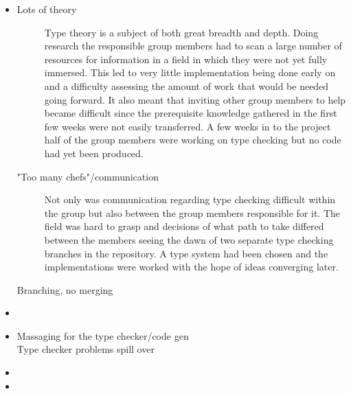 \begin{itemize}
  \item {}
  \begin{description}
    \item[Lots of theory]
      Type theory is a subject of both great breadth and depth. Doing research the responsible group members had to scan a large number of resources for information in a field in which they were not yet fully immersed. This led to very little implementation being done early on and a difficulty assessing the amount of work that would be needed going forward. It also meant that inviting other group members to help became difficult since the prerequisite knowledge gathered in the first few weeks were not easily transferred. A few weeks in to the project half of the group members were working on type checking but no code had yet been produced.
    \item["Too many chefs"/communication]
      Not only was communication regarding type checking difficult within the group but also between the group members responsible for it. The field was hard to grasp and decisions of what path to take differed between the members seeing the dawn of two separate type checking branches in the repository. A type system had been chosen and the implementations were worked with the hope of ideas converging later.
    \item[Branching, no merging]
  \end{description}

  \item {}
  \item {}

  \begin{description}
    \item[Massaging for the type checker/code gen]
    \item[Type checker problems spill over]
  \end{description}
  \item {}

  \item {}
\end{itemize}
